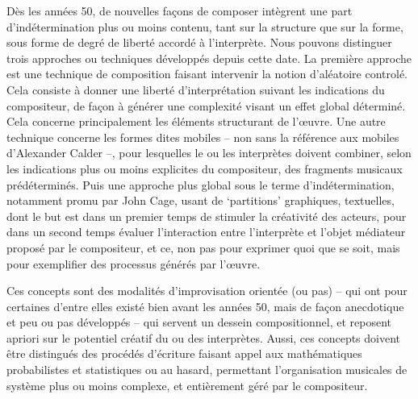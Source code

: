 \documentclass{article}
\begin{document}
Dès les années 50, de nouvelles façons de composer intègrent une part d'indétermination plus ou moins contenu, tant sur la structure que sur la forme, sous forme de degré de liberté accordé à l'interprète. Nous pouvons distinguer trois approches ou techniques développés depuis cette date. La première approche est une technique de composition faisant intervenir la notion d'aléatoire controlé. Cela consiste à donner une liberté d'interprétation suivant les indications du compositeur, de façon à générer une complexité visant un effet global déterminé. Cela concerne principalement les éléments structurant de l'œuvre. Une autre technique concerne les formes dites mobiles -- non sans la référence aux mobiles d'Alexander Calder --, pour lesquelles le ou les interprètes doivent combiner, selon les indications plus ou moins explicites du compositeur, des fragments musicaux prédéterminés. Puis une approche plus global sous le terme d'indétermination, notamment promu par John Cage, usant de `partitions' graphiques, textuelles, dont le but est dans un premier temps de stimuler la créativité des acteurs, pour dans un second temps évaluer l'interaction entre l'interprète et l'objet médiateur proposé par le compositeur, et ce, non pas pour exprimer quoi que se soit, mais pour exemplifier des processus générés par l'œuvre.

Ces concepts sont des modalités d'improvisation orientée (ou pas) -- qui ont pour certaines d'entre elles existé bien avant les années 50, mais de façon anecdotique et peu ou pas développés -- qui servent un dessein compositionnel, et reposent apriori sur le potentiel créatif du ou des interprètes.  Aussi, ces concepts doivent être distingués des procédés d'écriture faisant appel aux mathématiques probabilistes et statistiques ou au hasard, permettant l'organisation musicales de système plus ou moins complexe, et entièrement géré par le compositeur. %
\end{document}
